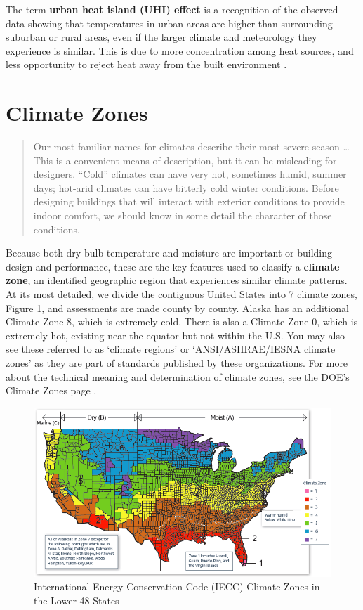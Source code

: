 \documentclass[10pt]{article}
\begin{document}
The term \textbf{urban heat island (UHI) effect}  is a recognition of the observed data showing that temperatures in urban areas are higher than surrounding suburban or rural areas, even if the larger climate and meteorology they experience is similar. This is due to more concentration among heat sources, and less opportunity to reject heat away from the built environment \cite{Grondzik2014-gt}.

\section{Climate Zones}

\begin{quote}
    Our most familiar names for climates describe their most severe season \ldots This is a convenient means of description, but it can be misleading for designers. ``Cold'' climates can have very hot, sometimes humid, summer days; hot-arid climates can have bitterly cold winter conditions. Before designing buildings that will interact with exterior conditions to provide indoor comfort, we should know in some detail the character of those conditions. \cite{Grondzik2014-gt}
\end{quote}

Because both dry bulb temperature and moisture are important or building design and performance, these are the key features used to classify a \textbf{climate zone}, an identified geographic region that experiences similar climate patterns. At its most detailed, we divide the contiguous United States into 7 climate zones, Figure \ref{CZs}, and assessments are made county by county. Alaska has an additional Climate Zone 8, which is extremely cold. There is also a Climate Zone 0, which is extremely hot, existing near the equator but not within the U.S.  You may also see these referred to as `climate regions' or `ANSI/ASHRAE/IESNA climate zones' as they are part of standards published by these organizations. For more about the technical meaning and determination of climate zones, see the DOE's Climate Zones page \cite{noauthor_undated-ax}. 

            \begin{figure}[h]
            \centering
            \includegraphics[width=6.5in]{extras09/climatezones.png}
            \caption{International Energy Conservation Code (IECC) Climate Zones in the Lower 48 States \cite{Baechler2015-me}}
            \label{CZs}
            \end{figure}
\end{document}
